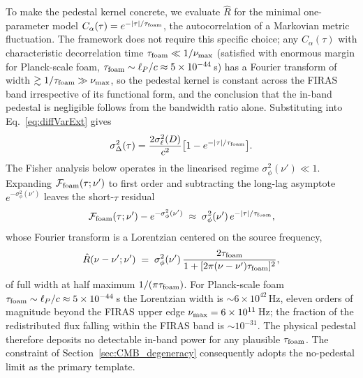 \documentclass[aps,prd,onecolumn,amsmath,amssymb]{revtex4-2}
\begin{document}
To make the pedestal kernel concrete, we evaluate $\hat{R}$ for the
minimal one-parameter model $C_\alpha(\tau)=e^{-|\tau|/\tau_{\rm foam}}$,
the autocorrelation of a Markovian metric fluctuation.  The framework
does not require this specific choice; any $C_\alpha(\tau)$ with
characteristic decorrelation time $\tau_{\rm foam}\ll 1/\nu_{\rm max}$
(satisfied with enormous margin for Planck-scale foam,
$\tau_{\rm foam}\sim\ell_P/c\approx 5\times10^{-44}$\,s)
has a Fourier transform of width $\gtrsim 1/\tau_{\rm foam}\gg
\nu_{\rm max}$, so the pedestal kernel is constant across the FIRAS
band irrespective of its functional form, and the conclusion that
the in-band pedestal is negligible follows from the bandwidth ratio
alone.  Substituting into Eq.~\eqref{eq:diffVarExt} gives
\begin{equation}
  \sigma_\Delta^2(\tau) = \frac{2\sigma_\ell^2(D)}{c^2}
    \bigl[1 - e^{-|\tau|/\tau_{\rm foam}}\bigr].
  \label{eq:sigmaDelta_exponential}
\end{equation}
The Fisher analysis below operates in the linearised regime
$\sigma_\phi^2(\nu')\ll 1$.  Expanding $\mathcal{F}_{\rm foam}(\tau;\nu')$
to first order and subtracting the long-lag asymptote
$e^{-\sigma_\phi^2(\nu')}$ leaves the short-$\tau$ residual
\begin{equation}
  \mathcal{F}_{\rm foam}(\tau;\nu') - e^{-\sigma_\phi^2(\nu')}
  \;\approx\; \sigma_\phi^2(\nu')\,e^{-|\tau|/\tau_{\rm foam}},
  \label{eq:Ffoam_residual_exponential}
\end{equation}
whose Fourier transform is a Lorentzian centered on the source
frequency,
\begin{equation}
  \hat{R}(\nu-\nu';\nu')
    \;=\; \sigma_\phi^2(\nu')\,
    \frac{2\tau_{\rm foam}}{1 + [2\pi(\nu-\nu')\tau_{\rm foam}]^2},
  \label{eq:R_lorentzian}
\end{equation}
of full width at half maximum $1/(\pi\tau_{\rm foam})$.  For Planck-scale foam
$\tau_{\rm foam}\sim\ell_P/c\approx 5\times 10^{-44}$\,s the
Lorentzian width is $\sim 6\times 10^{42}$\,Hz, eleven orders of
magnitude beyond the FIRAS upper edge $\nu_{\rm max}=6\times 10^{11}$\,Hz;
the fraction of the redistributed flux falling within the FIRAS band
is $\sim 10^{-31}$.  The physical pedestal therefore deposits no
detectable in-band power for any plausible $\tau_{\rm foam}$.  The
constraint of Section~\ref{sec:CMB_degeneracy} consequently
adopts the no-pedestal limit as the primary template.
\end{document}
